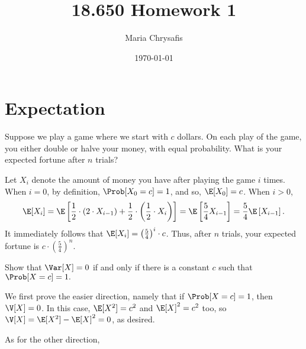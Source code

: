 \documentclass[a4paper]{article}
\author{Maria Chrysafis}
\date{\today}
\title{18.650 Homework 1}
\begin{document}
\maketitle
\section{Expectation}
\begin{Exercise}
	Suppose we play a game where we start with $c$ dollars. On each play of the game, you either double or halve your money, with equal probability. What is your expected fortune after $n$ trials?
\end{Exercise}
\begin{Solution}
	Let $X_i$ denote the amount of money you have after playing the game $i$ times. When $i = 0$, by definition, $\Prob[X_0 = c] = 1$, and so, $\E[X_0] = c$. When $i > 0$, 
	\begin{align*}
		\E[X_i] = \E \left[ \frac{1}{2} \cdot \left(2 \cdot X_{i - 1} \right) + \frac{1}{2} \cdot \left( \frac{1}{2} \cdot X_i \right) \right] = \E \left[\frac{5}{4} X_{i - 1} \right] = \frac{5}{4} \E \left[ X_{i - 1} \right].
	\end{align*}
	It immediately follows that $\E[X_i] = \left( \frac{5}{4} \right)^i \cdot c$. Thus, after $n$ trials, your expected fortune is $c \cdot \left( \frac{5}{4}\right)^n$.
\end{Solution}
\begin{Exercise}
	Show that $\Var[X] = 0$ if and only if there is a constant $c$ such that $\Prob[X = c]= 1.$
\end{Exercise}
\begin{Solution}
	We first prove the easier direction, namely that if $\Prob[X = c] = 1$, then $\V[X] = 0$. In this case, $\E[X^2] = c^2$ and $\E[X]^2 = c^2$ too, so $\V[X] = \E[X^2] - \E[X]^2 = 0$, as desired. 

	As for the other direction, 
\end{Solution}
\end{document}
